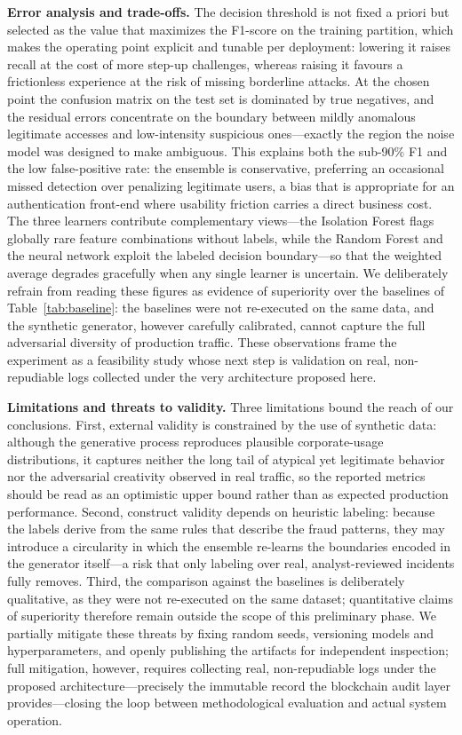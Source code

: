 \documentclass[conference]{IEEEtran}
\begin{document}
\textbf{Error analysis and trade-offs.} The decision threshold is not
fixed a priori but selected as the value that maximizes the F1-score on
the training partition, which makes the operating point explicit and
tunable per deployment: lowering it raises recall at the cost of more
step-up challenges, whereas raising it favours a frictionless experience
at the risk of missing borderline attacks. At the chosen point the
confusion matrix on the test set is dominated by true negatives, and the
residual errors concentrate on the boundary between mildly anomalous
legitimate accesses and low-intensity suspicious ones---exactly the
region the noise model was designed to make ambiguous. This explains
both the sub-90\% F1 and the low false-positive rate: the ensemble is
conservative, preferring an occasional missed detection over penalizing
legitimate users, a bias that is appropriate for an authentication
front-end where usability friction carries a direct business cost. The
three learners contribute complementary views---the Isolation Forest
flags globally rare feature combinations without labels, while the
Random Forest and the neural network exploit the labeled decision
boundary---so that the weighted average degrades gracefully when any
single learner is uncertain. We deliberately refrain from reading these
figures as evidence of superiority over the baselines of
Table~\ref{tab:baseline}: the baselines were not re-executed on the same
data, and the synthetic generator, however carefully calibrated, cannot
capture the full adversarial diversity of production traffic. These
observations frame the experiment as a feasibility study whose next step
is validation on real, non-repudiable logs collected under the very
architecture proposed here.

\textbf{Limitations and threats to validity.} Three limitations bound
the reach of our conclusions. First, external validity is constrained by
the use of synthetic data: although the generative process reproduces
plausible corporate-usage distributions, it captures neither the long
tail of atypical yet legitimate behavior nor the adversarial creativity
observed in real traffic, so the reported metrics should be read as an
optimistic upper bound rather than as expected production performance.
Second, construct validity depends on heuristic labeling: because the
labels derive from the same rules that describe the fraud patterns, they
may introduce a circularity in which the ensemble re-learns the
boundaries encoded in the generator itself---a risk that only labeling
over real, analyst-reviewed incidents fully removes. Third, the
comparison against the baselines is deliberately qualitative, as they
were not re-executed on the same dataset; quantitative claims of
superiority therefore remain outside the scope of this preliminary
phase. We partially mitigate these threats by fixing random seeds,
versioning models and hyperparameters, and openly publishing the
artifacts for independent inspection; full mitigation, however, requires
collecting real, non-repudiable logs under the proposed
architecture---precisely the immutable record the blockchain audit layer
provides---closing the loop between methodological evaluation and actual
system operation.
\end{document}

